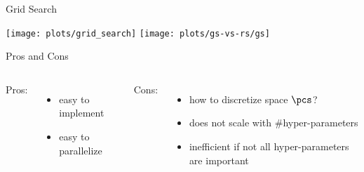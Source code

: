 \begin{frame}[c,fragile]{Grid Search }

\begin{center}
\texttt{[image: plots/grid\_search]}%
\texttt{[image: plots/gs-vs-rs/gs]}
\end{center}

\begin{block}{Pros and Cons}

\pause

\begin{columns}
Pros:
\begin{itemize}
  \item easy to implement
  \item easy to parallelize 
\end{itemize}

Cons:
\begin{itemize}
  \item how to discretize space $\pcs$?
  \item does not scale with $\#$hyper-parameters
  \item inefficient if not all hyper-parameters are important
\end{itemize}


\end{columns}

\end{block}

\end{frame}
